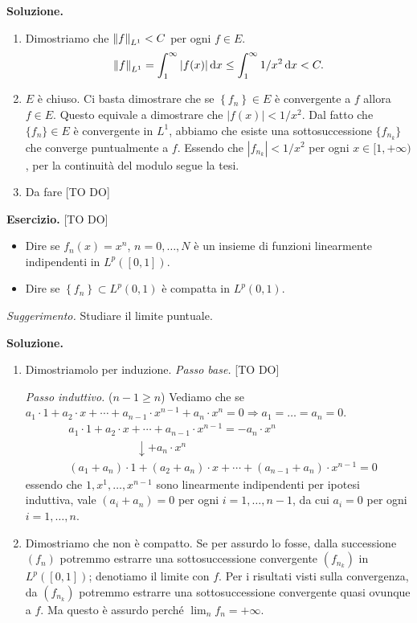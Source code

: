 \textbf{Soluzione.}
\begin{enumerate}

	\item Dimostriamo che $\left\lVert f \right\rVert_{L^1} < C$ per ogni $f \in E$.
	$$
	\left\lVert f \right\rVert_{L^1} = \int_1^\infty |f(x)| \,\mathrm{d} x \leq \int_1^\infty 1/x^2 \,\mathrm{d} x < C.
	$$

	\item $E$ è chiuso. Ci basta dimostrare che se $\left\{ f_n \right\} \in E$ è convergente a $f$ allora $f \in E$. Questo equivale a dimostrare che $|f(x)| < 1/x^2$.
	Dal fatto che $\{f_n\} \in E$ è convergente in $L^1$, abbiamo che esiste una sottosuccessione $\{f_{n_k}\}$ che converge puntualmente a $f$. Essendo che $|f_{n_k}| < 1/x^2$ per ogni $x \in [1,+\infty)$, per la continuità del modulo segue la tesi.

	\item Da fare [TO DO]

\end{enumerate}

\textbf{Esercizio.} [TO DO] 
\begin{itemize}
\item Dire se $f_n(x) = x^n$, $n = 0,\ldots , N$ è un insieme di funzioni linearmente indipendenti in $L^p([0,1])$.

\item Dire se $\left\{ f_n \right\} \subset L^p(0,1)$ è compatta in $L^p(0,1)$.
\end{itemize}
\textit{Suggerimento.} Studiare il limite puntuale.

\textbf{Soluzione.}
\begin{enumerate}

	\item Dimostriamolo per induzione.
	\textit{Passo base.} [TO DO]

	\textit{Passo induttivo.} ($n-1 \geq n$)
	Vediamo che se $a_1 \cdot 1 + a_2 \cdot x + \cdots + a_{n-1} \cdot x^{n-1} + a_n \cdot x^n = 0 \Longrightarrow a_1 = \ldots = a_n = 0$.
	\begin{align*}
		& a_1 \cdot 1 + a_2 \cdot x + \cdots + a_{n-1} \cdot x^{n-1} = - a_n \cdot x^n \\
		& \qquad \qquad \qquad \downarrow + a_n \cdot x^n \\
		& (a_1 + a_n) \cdot 1 + (a_2 + a_n) \cdot x + \cdots + (a_{n-1} + a_n) \cdot x^{n-1} = 0
	\end{align*}
	essendo che $1,x^1,\ldots,x^{n-1}$ sono linearmente indipendenti per ipotesi induttiva, vale $(a_i + a_n) = 0$ per ogni $i = 1,\ldots,n-1$, da cui $a_i = 0$ per ogni $i = 1,\ldots,n$.

	\item Dimostriamo che non è compatto. Se per assurdo lo fosse, dalla successione $(f_n)$ potremmo estrarre una sottosuccessione convergente $(f_{n_k})$ in $L^p([0,1])$; denotiamo il limite con $f$. Per i risultati visti sulla convergenza, da $(f_{n_k})$ potremmo estrarre una sottosuccessione convergente quasi ovunque a $f$. Ma questo è assurdo perché $\lim_n f_n = +\infty$.
\end{enumerate}

